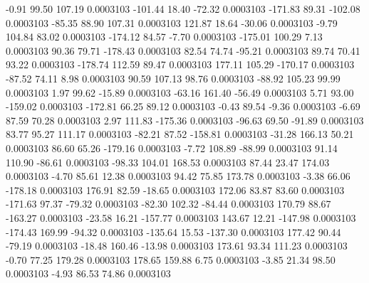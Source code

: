        -0.91       99.50      107.19     0.0003103
     -101.44       18.40      -72.32     0.0003103
     -171.83       89.31     -102.08     0.0003103
      -85.35       88.90      107.31     0.0003103
      121.87       18.64      -30.06     0.0003103
       -9.79      104.84       83.02     0.0003103
     -174.12       84.57       -7.70     0.0003103
     -175.01      100.29        7.13     0.0003103
       90.36       79.71     -178.43     0.0003103
       82.54       74.74      -95.21     0.0003103
       89.74       70.41       93.22     0.0003103
     -178.74      112.59       89.47     0.0003103
      177.11      105.29     -170.17     0.0003103
      -87.52       74.11        8.98     0.0003103
       90.59      107.13       98.76     0.0003103
      -88.92      105.23       99.99     0.0003103
        1.97       99.62      -15.89     0.0003103
      -63.16      161.40      -56.49     0.0003103
        5.71       93.00     -159.02     0.0003103
     -172.81       66.25       89.12     0.0003103
       -0.43       89.54       -9.36     0.0003103
       -6.69       87.59       70.28     0.0003103
        2.97      111.83     -175.36     0.0003103
      -96.63       69.50      -91.89     0.0003103
       83.77       95.27      111.17     0.0003103
      -82.21       87.52     -158.81     0.0003103
      -31.28      166.13       50.21     0.0003103
       86.60       65.26     -179.16     0.0003103
       -7.72      108.89      -88.99     0.0003103
       91.14      110.90      -86.61     0.0003103
      -98.33      104.01      168.53     0.0003103
       87.44       23.47      174.03     0.0003103
       -4.70       85.61       12.38     0.0003103
       94.42       75.85      173.78     0.0003103
       -3.38       66.06     -178.18     0.0003103
      176.91       82.59      -18.65     0.0003103
      172.06       83.87       83.60     0.0003103
     -171.63       97.37      -79.32     0.0003103
      -82.30      102.32      -84.44     0.0003103
      170.79       88.67     -163.27     0.0003103
      -23.58       16.21     -157.77     0.0003103
      143.67       12.21     -147.98     0.0003103
     -174.43      169.99      -94.32     0.0003103
     -135.64       15.53     -137.30     0.0003103
      177.42       90.44      -79.19     0.0003103
      -18.48      160.46      -13.98     0.0003103
      173.61       93.34      111.23     0.0003103
       -0.70       77.25      179.28     0.0003103
      178.65      159.88        6.75     0.0003103
       -3.85       21.34       98.50     0.0003103
       -4.93       86.53       74.86     0.0003103
